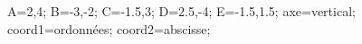 \documentclass[exercice]{thedocument}%
\begin{document}
%
\>A={2,4};%
\>B={-3,-2};%
\>C={-1.5,3};%
\>D={2.5,-4};%
\>E={-1.5,1.5};%
\>axe=vertical;%
\>coord1=ordonnées;%
\>coord2=abscisse;%
%
\end{document}
